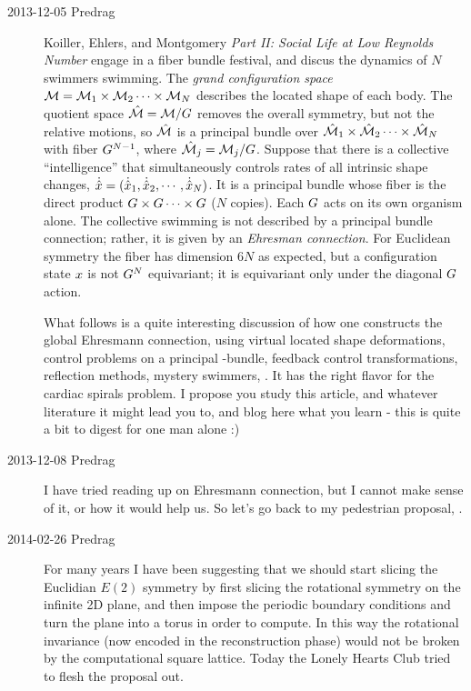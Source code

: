 \begin{description}
\item[2013-12-05 Predrag]
Koiller, Ehlers, and Montgomery \emph{Part II: Social Life
at Low Reynolds Number} engage in a fiber bundle festival, and discus the
dynamics of $N$ swimmers swimming. The \emph{grand configuration space}
$\mathcal{M} = \mathcal{M}_1 \times \mathcal{M}_2 \cdots \times\mathcal{M}_N $ describes the located
shape of each body. The quotient space $\hat{\cal M} = \mathcal{M}/G$ removes the
overall symmetry, but not the relative motions, so $\hat{\cal M}$ is a
principal bundle over $\hat{\cal M}_1 \times \hat{\cal M}_2 \cdots \times\hat{\cal M}_N $
with fiber $G^{N-1}$, where $\hat{\cal M}_j = \mathcal{M}_j/G$. Suppose that
there is a collective ``intelligence'' that simultaneously controls rates
of all intrinsic shape changes, $\dot{\hat{x}}  = (\dot{\hat{x}}_1,
\dot{\hat{x}}_2, \cdots, \dot{\hat{x}}_N)$. It is a principal bundle
whose fiber is the direct product $G \times G \cdots \times
G $ ($N$ copies). Each $G$ acts on its own organism alone. The
collective swimming is not described by a principal bundle connection;
rather, it is given by an \emph{Ehresman connection}. For Euclidean
symmetry the fiber has dimension $6N$ as expected, but a configuration state
$x$ is not $G^{N}$ equivariant; it is equivariant only under the
diagonal $G$ action.

What follows is a quite interesting discussion of how one constructs the
global Ehresmann connection, using virtual located shape deformations,
control problems on a principal \Group-bundle, feedback control
transformations, reflection methods, mystery swimmers, \etc. It has the
right flavor for the cardiac spirals problem. I propose you study this
article, and whatever literature it might lead you to, and blog here what
you learn - this is quite a bit to digest for one man alone :)

\item[2013-12-08 Predrag]
I have tried reading up on
{Ehresmann connection}, but I cannot make sense of it, or how it
would help us. So let's go back to my pedestrian proposal,
.

\item[2014-02-26 Predrag] For many years I have been suggesting that we
should start slicing the Euclidian $E(2)$ symmetry by first slicing
the rotational symmetry on the infinite 2D plane, and then impose
the periodic boundary conditions and turn the plane into a torus in order
to compute. In this way the rotational invariance (now encoded in
the reconstruction
phase) would not be broken by the computational square lattice. Today
the Lonely Hearts Club tried to flesh the proposal out.


\end{description}
